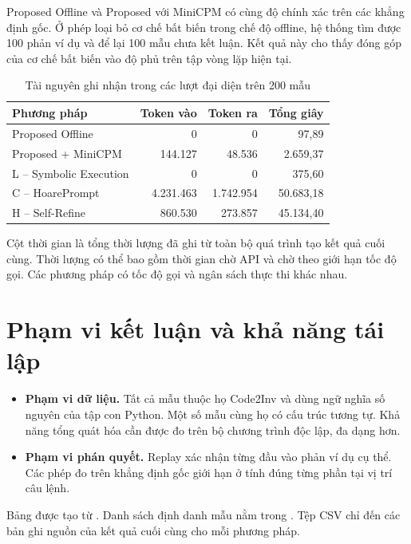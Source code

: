 Proposed Offline và Proposed với MiniCPM có cùng độ chính xác trên các khẳng định gốc. Ở phép loại bỏ cơ chế bất biến trong chế độ offline, hệ thống tìm được 100 phản ví dụ và để lại 100 mẫu chưa kết luận. Kết quả này cho thấy đóng góp của cơ chế bất biến vào độ phủ trên tập vòng lặp hiện tại.

\begin{table}[htbp]
\centering
\small
\caption{Tài nguyên ghi nhận trong các lượt đại diện trên 200 mẫu}
\label{tab:benchmark-resources}
\begin{tabular}{@{}lrrr@{}}
\toprule
\textbf{Phương pháp} & \textbf{Token vào} & \textbf{Token ra} & \textbf{Tổng giây} \\
\midrule
Proposed Offline & 0 & 0 & 97,89 \\
Proposed + MiniCPM & 144.127 & 48.536 & 2.659,37 \\
L -- Symbolic Execution & 0 & 0 & 375,60 \\
C -- HoarePrompt & 4.231.463 & 1.742.954 & 50.683,18 \\
H -- Self-Refine & 860.530 & 273.857 & 45.134,40 \\
\bottomrule
\end{tabular}
\end{table}

Cột thời gian là tổng thời lượng đã ghi từ toàn bộ quá trình tạo kết quả cuối cùng. Thời lượng có thể bao gồm thời gian chờ API và chờ theo giới hạn tốc độ gọi. Các phương pháp có tốc độ gọi và ngân sách thực thi khác nhau.

\section{Phạm vi kết luận và khả năng tái lập}
\label{sec:threats_to_validity}

\begin{itemize}
    \item \textbf{Phạm vi dữ liệu.} Tất cả mẫu thuộc họ Code2Inv và dùng ngữ nghĩa số nguyên của tập con Python. Một số mẫu cùng họ có cấu trúc tương tự. Khả năng tổng quát hóa cần được đo trên bộ chương trình độc lập, đa dạng hơn.
    \item \textbf{Phạm vi phán quyết.} Replay xác nhận từng đầu vào phản ví dụ cụ thể. Các phép đo trên khẳng định gốc giới hạn ở tính đúng từng phần tại vị trí câu lệnh.
\end{itemize}

Bảng được tạo từ . Danh sách định danh mẫu nằm trong . Tệp CSV chỉ đến các bản ghi nguồn của kết quả cuối cùng cho mỗi phương pháp.
